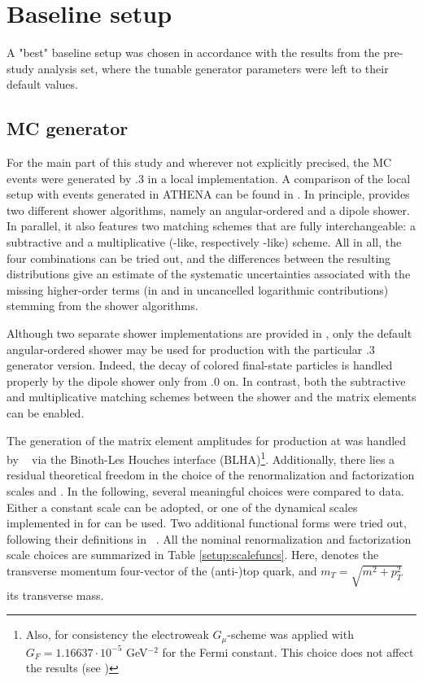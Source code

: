 \documentclass[PUB, UKenglish, texlive=2016]{\ATLASLATEXPATH atlasdoc}
\begin{document}
\section{Baseline setup}
\label{sec:setup}


A "best" baseline setup was chosen in accordance with the results from the pre-study analysis set, where the tunable generator parameters were left to their default values.

\subsection{MC generator}

For the main part of this study and wherever not explicitly precised, the MC events were generated by .3 in a local implementation. A comparison of the local setup with events generated in ATHENA can be found in \App{}. In principle, \HERWIG provides two different shower algorithms, namely an angular-ordered and a dipole shower. In parallel, it also features two matching schemes that are fully interchangeable: a subtractive and a multiplicative (\MCatNLO-like, respectively \POWHEG-like) scheme. All in all, the four combinations can be tried out, and the differences between the resulting distributions give an estimate of the systematic uncertainties associated with the missing higher-order terms (in \alphas and in uncancelled logarithmic contributions) stemming from the shower algorithms.

Although two separate shower implementations are provided in \HERWIG, only the default angular-ordered shower may be used for \ttbar production with the particular .3 generator version. Indeed, the decay of colored final-state particles is handled properly by the dipole shower only from .0 on. In contrast, both the subtractive and multiplicative matching schemes between the shower and the matrix elements can be enabled.

The generation of the matrix element amplitudes for \ttbar production at \NLO was handled by \GoSam ~\cite{Cullen:2011ac} via the Binoth-Les Houches interface (BLHA)\footnote{Also, for consistency the electroweak $G_{\mu}$-scheme was applied with $G_F=1.16637 \cdot 10^{-5}$ GeV$^{-2}$ for the Fermi constant. This choice does not affect the results (see \App)}. Additionally, there lies a residual theoretical freedom in the choice of the renormalization and factorization scales \muR and \muF. In the following, several meaningful choices were compared to data. Either a constant scale can be adopted, or one of the dynamical scales implemented in \HERWIG for \ttbar can be used. Two additional functional forms were tried out, following their definitions in ~\cite{Czakon:2016dgf}. All the nominal renormalization and factorization scale choices are summarized in Table \ref{setup:scalefuncs}. Here, \pT denotes the transverse momentum four-vector of the (anti-)top quark, and $m_T=\sqrt{m^2+p_T^2}$ its transverse mass.
\end{document}
